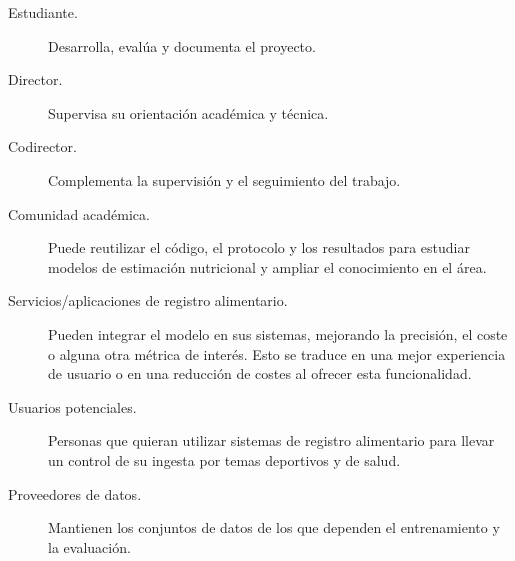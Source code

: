 \begin{description}
  \item[Estudiante.] Desarrolla, evalúa y documenta el proyecto.
  \item[Director.] Supervisa su orientación académica y técnica.
  \item[Codirector.] Complementa la supervisión y el seguimiento del trabajo.
  \item[Comunidad académica.] Puede reutilizar el código, el protocolo y los
  resultados para estudiar modelos de estimación nutricional y ampliar el conocimiento en el área.
  \item[Servicios/aplicaciones de registro alimentario.] Pueden integrar el modelo en sus sistemas,
  mejorando la precisión, el coste o alguna otra métrica de interés. Esto se traduce en una mejor experiencia
  de usuario o en una reducción de costes al ofrecer esta funcionalidad.
  \item[Usuarios potenciales.] Personas que quieran utilizar sistemas de registro alimentario
  para llevar un control de su ingesta por temas deportivos y de salud.
  \item[Proveedores de datos.] Mantienen los conjuntos de datos de los que
  dependen el entrenamiento y la evaluación.
\end{description}
